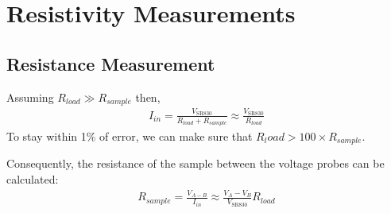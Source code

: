 \documentclass[../Matt_Gebert_Honours_Thesis.tex]{subfiles}
\begin{document}
	
\section{Resistivity Measurements}
	\subsection{Resistance Measurement}
	Assuming $R_{load} \gg R_{sample}$ then,
	\begin{align}
		I_{in} = \frac{V_{\text{SR830}}}{R_{load} + R_{sample}} \approx\frac{V_{\text{SR830}}}{R_{load}}
	\end{align}
	To stay within 1\% of error, we can make sure that $R_load > 100 \times R_{sample}$.
	
	Consequently, the resistance of the sample between the voltage probes can be calculated:
	\begin{align}
		R_{sample} = \frac{V_{A-B}}{I_{in}} \approx \frac{V_{A} - V_{B}}{V_{\text{SR830}}} R_{load}
	\end{align}
	
\end{document}
